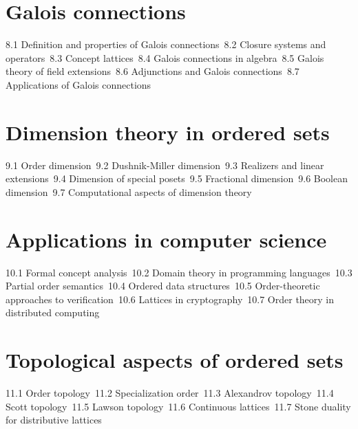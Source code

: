 \section{Galois connections}
8.1 Definition and properties of Galois connections\
8.2 Closure systems and operators\
8.3 Concept lattices\
8.4 Galois connections in algebra\
8.5 Galois theory of field extensions\
8.6 Adjunctions and Galois connections\
8.7 Applications of Galois connections\
\section{Dimension theory in ordered sets}
9.1 Order dimension\
9.2 Dushnik-Miller dimension\
9.3 Realizers and linear extensions\
9.4 Dimension of special posets\
9.5 Fractional dimension\
9.6 Boolean dimension\
9.7 Computational aspects of dimension theory\
\section{Applications in computer science}
10.1 Formal concept analysis\
10.2 Domain theory in programming languages\
10.3 Partial order semantics\
10.4 Ordered data structures\
10.5 Order-theoretic approaches to verification\
10.6 Lattices in cryptography\
10.7 Order theory in distributed computing\
\section{Topological aspects of ordered sets}
11.1 Order topology\
11.2 Specialization order\
11.3 Alexandrov topology\
11.4 Scott topology\
11.5 Lawson topology\
11.6 Continuous lattices\
11.7 Stone duality for distributive lattices\
